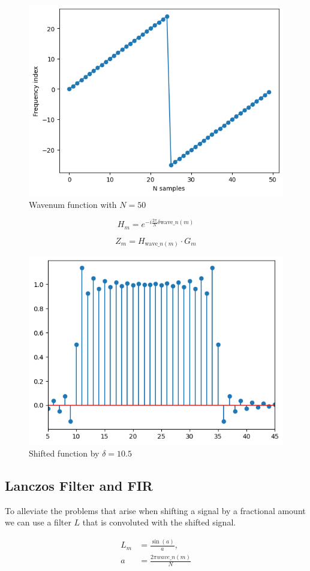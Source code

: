 \documentclass[]{usiinfbachelorproject}
\begin{document}
	\begin{figure}[h]
		\centering
		\includegraphics[width=0.5\columnwidth]{images/wavenum_n50.png}
		\caption{Wavenum function with $N=50$}
	\end{figure}
	
	\begin{equation*}
		H_m = e^{-i \frac{2\pi}{N}  \delta \text{wave}\_n(m)}
	\end{equation*}
	
	\begin{equation}
		Z_m = H_{\text{wave}\_n(m)} \cdot G_m
	\end{equation}	
	
	\iffalse

	
	\begin{figure}[h]
		\centering
		\includegraphics[width=0.5\columnwidth]{images/box_shifted_delta10_1_n50.png}
		\caption{Shifted function by $\delta=10.5$}
	\end{figure}
	
	\subsection{Lanczos Filter and FIR}
	To alleviate the problems that arise when shifting a signal by a fractional amount we can use a filter $L$ that is convoluted with the shifted signal.
	
	\begin{align*}
		L_m &= \frac{\sin(a)}{a},\\
		a &= \frac{2\pi wave\_n(m)}{N}
	\end{align*}
	
\end{document}
